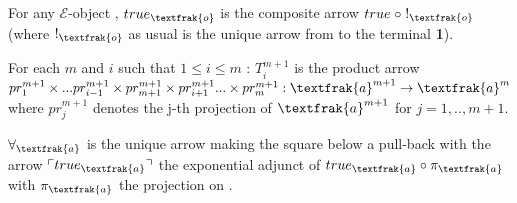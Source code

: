 \begin{definition}
	For any $\mathcal{E}$-object , \newline
	$true_\textfrak{o}$ is the composite arrow $true \;\circ\; !_\textfrak{o}$ \newline
	(where $!_\textfrak{o}$ as usual is the unique arrow from  to the terminal \textbf{1}).
	
\end{definition}


\begin{definition}[$T_i^{m+1}$] For each $m$ and $i$ such that $1 \leq i \leq m$ : \newline
	$T_i^{m+1}$  is the product arrow $pr_1^{m+1} \times ... pr_{i-1}^{m+1} \times pr_{m+1}^{m+1} \times pr_{i+1}^{m+1}... \times pr_{m}^{m+1} : \textfrak{a}^{m+1} \rightarrow \textfrak{a}^m$ \newline
	where $pr_j ^{m+1}$ denotes the j-th projection of $\textfrak{a}^{m+1}$ for $j=1,..,m+1$.
\end{definition}

\begin{definition}
	$\forall_$ is the unique arrow making the square below a pull-back with the arrow $\ulcorner true_\textfrak{a} \urcorner$ the exponential adjunct of $true_\textfrak{a} \circ \pi_\textfrak{a} $ with $\pi_\textfrak{a}$ the projection on \textfrak{a}.
	\begin{figure}[h]
			\centering
			\
		\end{figure}
\end{definition}


